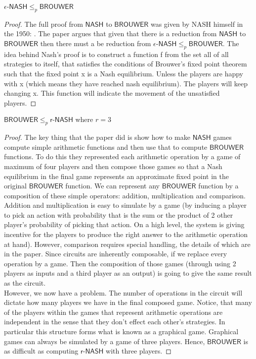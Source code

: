 \documentclass[11pt]{article}
\newcommand{\NASH}{\mathsf{NASH}}
\newcommand{\eNASH}{\mathsf{\text{$\epsilon$-}NASH}}
\newcommand{\rNASH}{\mathsf{\text{$r$-}NASH}}
\begin{document}
\begin{lemma}
    $\eNASH \leq_p \mathsf{BROUWER}$    
\end{lemma}
\begin{proof}
    The full proof from $\NASH$ to $\mathsf{BROUWER}$ was given by NASH  himself in the 1950: \cite{Nash48}. The paper argues that given that there is a reduction from $\NASH$ to $\mathsf{BROUWER}$ then there must a be reduction from $\eNASH \leq_p \mathsf{BROUWER}$.
    The idea behind Nash’s proof is to construct a function f from the set all of all strategies to itself, that satisfies the conditions of Brouwer’s fixed point theorem such that the fixed point x is a Nash equilibrium.  Unless the players are happy with x (which means they have reached nash equilibrium). The players will keep changing x. This function will indicate the movement of the unsatisfied players.
\end{proof}


\begin{lemma}
    $\mathsf{BROUWER} \leq_p \rNASH$ where $r=3$    
\end{lemma}
\begin{proof}
The key thing that the paper did is show how to make $\NASH$ games compute simple arithmetic functions and then use that to compute $\mathsf{BROUWER}$ functions. To do this they represented each arithmetic operation by a game of maximum of four players and then compose those games so that a Nash equilibrium in the final game represents an approximate fixed point in the original $\mathsf{BROUWER}$ function. We can represent any $\mathsf{BROUWER}$ function by a composition of these simple operators: addition, multiplication and comparison.  Addition and multiplication is easy to simulate by a game (by inducing a player to pick an action with probability that is the sum or the product of 2 other player's probability of picking that action. On a high level, the system is giving incentive for the players to produce the right answer to the arithmetic operation at hand). However, comparison requires special handling, the details of which are in the paper. Since circuits are inherently composable, if we replace every operation by a game. Then the composition of those games (through using 2 players as inputs and a third player as an output) is going to give the same result as the circuit.\\
However, we now have a problem. The number of operations in the circuit will dictate how many players we have in the final composed game. Notice, that many of the players within the games that represent arithmetic operations are independent in the sense that they don't effect each other's strategies. In particular this structure forms what is known as a graphical game. Graphical games can always be simulated by a game of three players. Hence, $\mathsf{BROUWER}$ is as difficult as computing $\rNASH$ with three players.
\end{proof}
\end{document}
